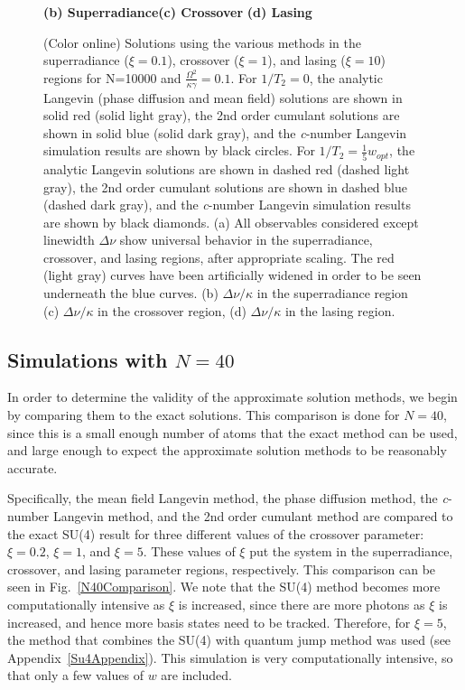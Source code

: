 \documentclass[aps,
twocolumn,
superscriptaddress,groupedaddress]{revtex4}
\begin{document}
\begin{figure}
\begin{center}
	\hspace{-10mm}\textbf{(b) Superradiance}\hspace{33mm}\textbf{(c) Crossover}
  \hspace{37mm}\textbf{(d) Lasing}
\end{center}
		\vspace{-5mm}
\caption{(Color online) Solutions using the various methods in the
superradiance ($\xi=0.1$), crossover ($\xi=1$), and lasing ($\xi=10$)
regions for N=10000 and $\frac{\Omega^2}{\kappa \gamma}=0.1$. For $1/T_2=0$, the analytic Langevin (phase diffusion and mean field) solutions are shown in solid red (solid light gray), the 2nd order
cumulant solutions are shown in solid blue (solid dark gray), and the
{\it c}-number Langevin simulation results are shown by black circles. For
$1/T_2=\frac{1}{5} w_{opt}$, the analytic Langevin solutions are shown in
dashed red (dashed light gray), the 2nd order cumulant solutions are shown
in dashed blue (dashed dark gray), and the {\it c}-number Langevin simulation
results are shown by black diamonds. (a) All observables considered
except linewidth  $\Delta \nu$ show universal behavior in the
superradiance, crossover, and lasing regions, after appropriate scaling.
The red (light gray) curves have been artificially widened in order to
be seen underneath the blue curves. (b)  $\Delta \nu / \kappa$ in the
superradiance region (c) $\Delta \nu / \kappa$ in the crossover region,
(d) $\Delta \nu / \kappa$ in the lasing region.}
 \label{N10000Comparison}
\end{figure}

\subsection{Simulations with $N=40$}
In order to determine the validity of the approximate solution methods, we begin by comparing them to the exact solutions. This comparison is done for $N=40$, since this is a small enough number of atoms that the exact method can be used, and large enough to expect the approximate solution methods to be reasonably accurate. 

Specifically, the mean field Langevin method, the phase diffusion method, the {\it c}-number Langevin method, and the 2nd order cumulant method are compared to the exact SU(4) result for three different values of the crossover parameter:
$\xi=0.2$, $\xi=1$, and $\xi=5$. These values of $\xi$ put the system in the
superradiance, crossover, and lasing parameter regions, respectively.
This comparison can be seen in Fig.~\ref{N40Comparison}. We note that the SU(4) method becomes more computationally intensive as $\xi$ is increased, since there are more photons as $\xi$ is increased, and hence
more basis states need to be tracked. Therefore, for $\xi=5$, the method
that combines the SU(4) with quantum jump method was used (see Appendix~\ref{Su4Appendix}). This
simulation is very computationally intensive, so that only a few values of $w$
are included.
\end{document}
